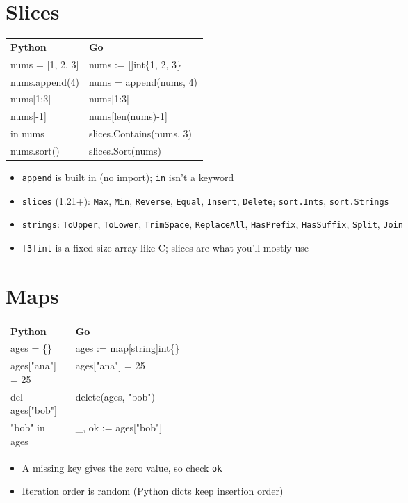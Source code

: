 \documentclass[9pt]{extarticle}
\newcommand{\Go}{\textbf{\textcolor{goblue}{Go}}}
\newcommand{\kw}[1]{\textcolor{accent}{\texttt{#1}}}
\begin{document}
\begin{multicols*}{2}
\section{Slices}
\renewcommand{\arraystretch}{1.1}
{\footnotesize\ttfamily
\begin{tabularx}{\linewidth}{@{}>{\raggedright\arraybackslash}p{0.33\linewidth}X@{}}
\rowcolor{tablehead}\textsf{\textbf{Python}} & \textsf{\textbf{\Go}}\\
nums = [1, 2, 3]  & nums := []int\{1, 2, 3\}\\
nums.append(4)    & nums = append(nums, 4)\\
nums[1:3]         & nums[1:3]\\
nums[-1]          & nums[len(nums)-1]\\
3 in nums         & slices.Contains(nums, 3)\\
nums.sort()       & slices.Sort(nums)\\
\end{tabularx}}
\begin{itemize}
  \item \kw{append} is built in (no import); \kw{in} isn't a keyword
  \item \kw{slices} (1.21+): \kw{Max}, \kw{Min}, \kw{Reverse}, \kw{Equal}, \kw{Insert}, \kw{Delete}; \kw{sort.Ints}, \kw{sort.Strings}
  \item \kw{strings}: \kw{ToUpper}, \kw{ToLower}, \kw{TrimSpace}, \kw{ReplaceAll}, \kw{HasPrefix}, \kw{HasSuffix}, \kw{Split}, \kw{Join}
  \item \kw{[3]int} is a fixed-size array like C; slices are what you'll mostly use
\end{itemize}

\section{Maps}
{\footnotesize\ttfamily
\begin{tabularx}{\linewidth}{@{}>{\raggedright\arraybackslash}p{0.33\linewidth}X@{}}
\rowcolor{tablehead}\textsf{\textbf{Python}} & \textsf{\textbf{\Go}}\\
ages = \{\}          & ages := map[string]int\{\}\\
ages["ana"] = 25    & ages["ana"] = 25\\
del ages["bob"]     & delete(ages, "bob")\\
"bob" in ages       & \_, ok := ages["bob"]\\
\end{tabularx}}
\begin{itemize}
  \item A missing key gives the zero value, so check \kw{ok}
  \item Iteration order is random (Python dicts keep insertion order)
\end{itemize}


\end{multicols*}
\end{document}
